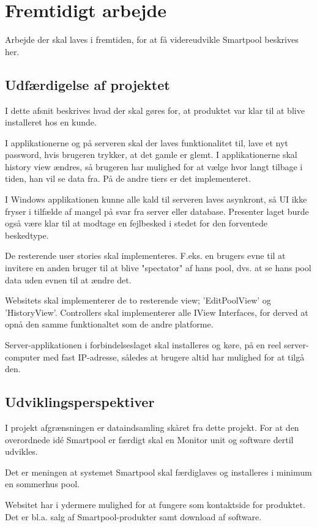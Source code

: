 \chapter{Fremtidigt arbejde}
Arbejde der skal laves i fremtiden, for at få videreudvikle Smartpool beskrives her.
\section{Udfærdigelse af projektet}
I dette afsnit beskrives hvad der skal gøres for, at produktet var klar til at blive installeret hos en kunde.

I applikationerne og på serveren skal der laves funktionalitet til, lave et nyt password, hvis brugeren trykker, at det gamle er glemt.
I applikationerne skal history view ændres, så brugeren har mulighed for at vælge hvor langt tilbage i tiden, han vil se data fra. På de andre tiers er det implementeret.

I Windows applikationen kunne alle kald til serveren laves asynkront, så UI ikke fryser i tilfælde af mangel på svar fra server eller database. Presenter laget burde også være klar til at modtage en fejlbesked i stedet for den forventede beskedtype.

De resterende user stories skal implementeres. F.eks. en brugers evne til at invitere en anden bruger til at blive "spectator" af hans pool, dvs. at se hans pool data uden evnen til at ændre det.

Websitets skal implementerer de to resterende view; 'EditPoolView' og 'HistoryView'. Controllers skal implementerer alle IView Interfaces, for derved at opnå den samme funktionaltet som de andre platforme.   

Server-applikationen i forbindelseslaget skal installeres og køre, på en reel server-computer med fast IP-adresse, således at brugere altid har mulighed for at tilgå den.


\section{Udviklingsperspektiver}
I projekt afgrænsningen er dataindsamling skåret fra dette projekt. For at den overordnede idé Smartpool er færdigt skal en Monitor unit og software dertil udvikles.

Det er meningen at systemet Smartpool skal færdiglaves og installeres i minimum en sommerhus pool.

Websitet har i ydermere mulighed for at fungere som kontaktside for produktet. Det er bl.a. salg af Smartpool-produkter samt download af software. 
